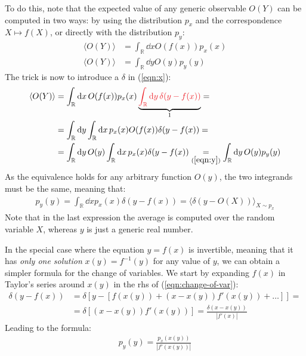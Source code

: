 \documentclass[../template.tex]{subfiles}
\begin{document}
To do this, note that the expected value of any generic observable $O(Y)$ can be computed in two ways: by using the distribution $p_x$ and the correspondence $X \mapsto f(X)$, or directly with the distribution $p_y$:
\begin{subequations}
    \begin{align} \label{eqn:x}
        \langle O(Y) \rangle &= \int_{\mathbb{R}} \dd{x} O(f(x)) p_x(x)\\
        \langle O(Y) \rangle &= \int_{\mathbb{R}} \dd{y} O(y) p_y(y)\label{eqn:y}
    \end{align}
\end{subequations}
The trick is now to introduce a $\delta$ in (\ref{eqn:x}):
\begin{align*}
    \langle O(Y) \rangle &= \int_{\mathbb{R}} \dd{x} O(f(x))p_x(x) \underbrace{\textcolor{Red}{\int_{\mathbb{R}} \dd{y} \delta(y-f(x))}}_{1} =\\
    &= \int_{\mathbb{R}} \dd{y} \int_{\mathbb{R}} \dd{x} p_x(x) O(f(x)) \delta(y-f(x)) =\\
    &= \int_{\mathbb{R}} \dd{y} O(y) \int_{\mathbb{R}} \dd{x} p_x(x) \delta(y-f(x)) \underset{(\ref{eqn:y})}{=} \int_{\mathbb{R}} \dd{y} O(y) p_y(y)
\end{align*}
As the equivalence holds for any arbitrary function $O(y)$, the two integrands must be the same, meaning that:
\begin{align} \label{eqn:change-of-var}
    p_y(y) = \int_{\mathbb{R}} \dd{x} p_x(x) \delta(y-f(x)) = \langle \delta(y-O(X)) \rangle_{X \sim p_x}
\end{align}
Note that in the last expression the average is computed over the random variable $X$, whereas $y$ is just a generic real number.

\medskip

In the special case where the equation $y=f(x)$ is invertible, meaning that it has \textit{only one solution} $x(y) = f^{-1}(y)$ for any value of $y$, we can obtain a simpler formula for the change of variables. We start by expanding $f(x)$ in Taylor's series around $x(y)$ in the rhs of (\ref{eqn:change-of-var}):
\begin{align*}
    \delta(y-f(x)) &= \delta[y-[f(x(y)) + (x-x(y))f'(x(y)) + \dots]] =\\
    &= \delta[(x-x(y)) f'(x(y))] = \frac{\delta(x-x(y))}{|f'(x)|} 
\end{align*}
Leading to the formula:
\begin{align} \label{eqn:change-of-var-special}
    p_y(y) = \frac{p_x(x(y))}{|f'(x(y))|} 
\end{align}
\end{document}
